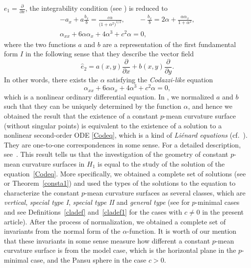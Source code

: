 \documentclass[pdftex]{sigma}
\numberwithin{equation}{section}
\begin{document}
$e_{1}=\frac{\partial}{\partial x}$,
 the integrability condition (see \cite{ChiuH/LiuH:2022}) is reduced to
\begin{gather}
-a_{x}+a\frac{b_{x}}{b}=\frac{c\alpha}{\bigl(1+\alpha^2\bigr)^{1/2}},\qquad
-\frac{b_{x}}{b}=2\alpha+\frac{\alpha\alpha_{x}}{1+\alpha^2},\nonumber\\
\alpha_{xx}+6\alpha\alpha_{x}+4\alpha^{3}+c^{2}\alpha=0,\label{intcon}
\end{gather}
where the two functions $a$ and $b$ are a representation of the first fundamental form $I$ in the following sense that they describe the vector field
\begin{equation*}
\hat{e}_{2}=a(x, y)\frac{\partial}{\partial x}+b(x, y)\frac{\partial}{\partial y}.
\end{equation*}
In other words, there exists the $\alpha$ satisfying the \emph{Codazzi-like} equation
\begin{equation}\label{Codeq}
\alpha_{xx}+6\alpha\alpha_{x}+4\alpha^{3}+c^{2}\alpha=0,
\end{equation}
which is a nonlinear ordinary differential equation. In \cite{ChiuH/LiuH:2022}, we normalized $a$ and $b$ such that they can be uniquely determined by the function $\alpha$, and hence we obtained the result that the existence of a constant $p$-mean curvature surface (without singular points) is equivalent to the existence of a solution to a nonlinear second-order ODE \eqref{Codeq}, which is a kind of \emph{Li\'{e}nard equations} (cf.\ \cite{Polyanin/Zaitsev:2003}). They are one-to-one correspondences in some sense. For a detailed description, see~\cite[Theorems~1.1, 1.3 and~6.3]{ChiuH/LiuH:2022}. This result tells us that the investigation of the geometry of constant $p$-mean curvature surfaces in $H_{1}$ is equal to the study of the solution of the equation~\eqref{Codeq}. More specifically, we obtained a complete set of solutions (see \cite[Theorems~1.2 and~1.4]{ChiuH/LiuH:2022} or Theorem~\ref{consta1}) and used the types of the solutions to the equation to characterize the constant $p$-mean curvature surfaces as several classes, which are \emph{vertical}, \emph{special type I}, \emph{special type II} and \emph{general type} (see \cite[Definitions 5.1 and 5.2]{ChiuH/LiuH:2022} for $p$-minimal cases and see Definitions~\ref{cladef} and~\ref{cladef1} for the cases with $c\neq 0$ in the present article). After the process of normalization, we obtained a complete set of invariants from the normal form of the $\alpha$-function. It is worth of our mention that these invariants in some sense measure how different a constant $p$-mean curvature surface is from the model case, which is the horizontal plane in the $p$-minimal case, and the Pansu sphere in the case $c>0$.
\end{document}

